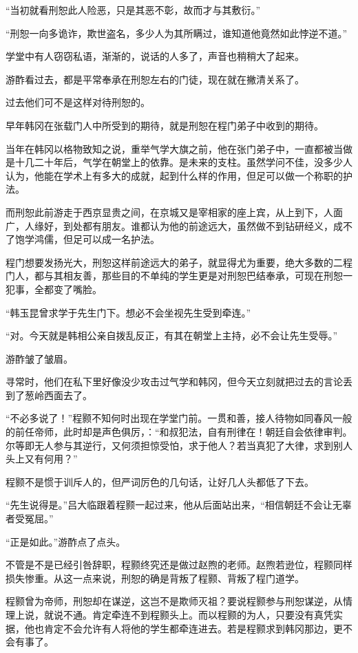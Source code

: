 “当初就看刑恕此人险恶，只是其恶不彰，故而才与其敷衍。”

“刑恕一向多诡诈，欺世盗名，多少人为其所瞒过，谁知道他竟然如此悖逆不道。”

学堂中有人窃窃私语，渐渐的，说话的人多了，声音也稍稍大了起来。

游酢看过去，都是平常奉承在刑恕左右的门徒，现在就在撇清关系了。

过去他们可不是这样对待刑恕的。

早年韩冈在张载门人中所受到的期待，就是刑恕在程门弟子中收到的期待。

当年在韩冈以格物致知之说，重举气学大旗之前，他在张门弟子中，一直都被当做是十几二十年后，气学在朝堂上的依靠。是未来的支柱。虽然学问不佳，没多少人认为，他能在学术上有多大的成就，起到什么样的作用，但足可以做一个称职的护法。

而刑恕此前游走于西京显贵之间，在京城又是宰相家的座上宾，从上到下，人面广，人缘好，到处都有朋友。谁都认为他的前途远大，虽然做不到钻研经义，成不了饱学鸿儒，但足可以成一名护法。

程门想要发扬光大，刑恕这样前途远大的弟子，就显得尤为重要，绝大多数的二程门人，都与其相友善，那些目的不单纯的学生更是对刑恕巴结奉承，可现在刑恕一犯事，全都变了嘴脸。

“韩玉昆曾求学于先生门下。想必不会坐视先生受到牵连。”

“对。今天就是韩相公亲自拨乱反正，有其在朝堂上主持，必不会让先生受辱。”

游酢皱了皱眉。

寻常时，他们在私下里好像没少攻击过气学和韩冈，但今天立刻就把过去的言论丢到了葱岭西面去了。

“不必多说了！”程颢不知何时出现在学堂门前。一贯和善，接人待物如同春风一般的前任帝师，此时却是声色俱厉，：“和叔犯法，自有刑律在！朝廷自会依律审判。尔等即无人参与其逆行，又何须担惊受怕，求于他人？若当真犯了大律，求到别人头上又有何用？”

程颢不是惯于训斥人的，但严词厉色的几句话，让好几人头都低了下去。

“先生说得是。”吕大临跟着程颢一起过来，他从后面站出来，“相信朝廷不会让无辜者受冤屈。”

“正是如此。”游酢点了点头。

不管是不是已经引咎辞职，程颢终究还是做过赵煦的老师。赵煦若逊位，程颢同样损失惨重。从这一点来说，刑恕的确是背叛了程颢、背叛了程门道学。

程颢曾为帝师，刑恕却在谋逆，这岂不是欺师灭祖？要说程颢参与刑恕谋逆，从情理上说，就说不通。肯定牵连不到程颢头上。而以程颢的为人，只要没有真凭实据，他也肯定不会允许有人将他的学生都牵连进去。若是程颢求到韩冈那边，更不会有事了。

